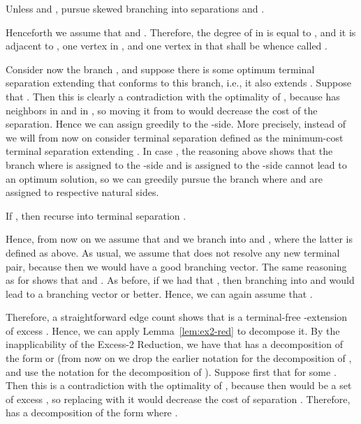 \begin{branching}
Unless  and , pursue skewed branching into separations  and .
\end{branching}









Henceforth we assume that  and . Therefore, the degree of  in  is equal to , and it is adjacent to , one vertex in , and one vertex in  that shall be whence called .

Consider now the branch , and suppose there is some optimum terminal separation  extending  that conforms to this branch, i.e., it also extends . Suppose that . Then this is clearly a contradiction with the optimality of , because  has  neighbors in  and  in , so moving it from  to  would decrease the cost of the separation. Hence we can assign  greedily to the -side. More precisely, instead of  we will from now on consider terminal separation  defined as the minimum-cost terminal separation extending . In case , the reasoning above shows that the branch where  is assigned to the -side and  is assigned to the -side cannot lead to an optimum solution, so we can greedily pursue the branch where  and  are assigned to respective natural sides.

\begin{reductionstep}
If , then recurse into terminal separation .
\end{reductionstep}

Hence, from now on we assume that  and we branch into  and , where the latter is defined as above. As usual, we assume that  does not resolve any new terminal pair, because then we would have a good branching vector. The same reasoning as for  shows that  and . As before, if we had that , then branching into  and  would lead to a branching vector  or better. Hence, we can again assume that .

Therefore, a straightforward edge count shows that  is a terminal-free -extension of excess . Hence, we can apply Lemma~\ref{lem:ex2-red} to decompose it. By the inapplicability of the Excess-2 Reduction, we have that  has a decomposition of the form  or  (from now on we drop the earlier notation for the decomposition of , and use the notation  for the decomposition of ). Suppose first that  for some . Then this is a contradiction with the optimality of , because then  would be a set of excess , so replacing  with it would decrease the cost of separation . Therefore,  has a decomposition of the form  where . 


